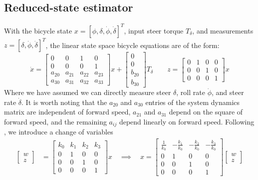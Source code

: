 \documentclass[letterpaper,11pt]{article}
\begin{document}
\subsection{Reduced-state estimator} \label{reducedstate}
With the bicycle state $x = \left[\phi, \delta, \dot{\phi},
\dot{\delta}\right]^T$, input steer torque $T_\delta$, and measurements $z =
[\delta, \dot{\phi}, \dot{\delta}]^T$,
the linear state space bicycle equations are of the form:
\begin{equation*}
\dot{x} =\left[\begin{smallmatrix}0 & 0 & 1 & 0\\0 & 0 & 0 & 1\\a_{20} & a_{21} &
a_{22} & a_{23}\\a_{30} & a_{31} & a_{32} & a_{33}\end{smallmatrix}\right] x +
\left[\begin{smallmatrix}0\\0\\b_{20}\\b_{30}\end{smallmatrix}\right] T_\delta
\qquad
z = \left[\begin{smallmatrix}0 & 1 & 0 & 0\\ 0 & 0 & 1 & 0\\ 0 & 0 & 0 &
1\end{smallmatrix}\right] x
\end{equation*}
Where we have assumed we can directly measure steer $\delta$, roll rate
$\dot{\phi}$, and steer rate $\dot{\delta}$.  It is worth noting that the
$a_{20}$ and $a_{30}$ entries of the system dynamics matrix are independent of
forward speed, $a_{21}$ and $a_{31}$ depend on the square of forward speed, and
the remaining $a_{ij}$ depend linearly on forward speed.  Following
\cite{Bryson1970}, we introduce a change of variables
\begin{align*}
\left[\begin{smallmatrix}w \\ z\end{smallmatrix}\right] &=
\left[\begin{smallmatrix}k_0 & k_1 & k_2 & k_3 \\ 0 & 1 & 0 & 0\\ 0 & 0 & 1 & 0\\ 0 & 0 & 0 &
1\end{smallmatrix}\right] x  \quad\implies\quad
x =
\left[\begin{smallmatrix}\frac{1}{k_{0}} & - \frac{k_{1}}{k_{0}} & -
  \frac{k_{2}}{k_{0}} & - \frac{k_{3}}{k_{0}}\\0 & 1 & 0 & 0\\0 & 0 & 1 & 0\\0
  & 0 & 0 & 1\end{smallmatrix}\right]\left[\begin{smallmatrix} w \\ z\end{smallmatrix}\right]
\end{align*}
\end{document}
